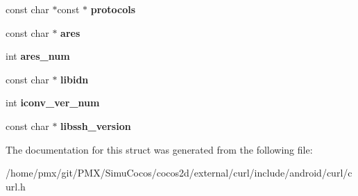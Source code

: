 \begin{DoxyCompactItemize}
\item 
\mbox{\label{structcurl__version__info__data_acf90bd53790e3b26dd1d03010a9a6516}} 
const char $\ast$const  $\ast$ {\bfseries protocols}
\item 
\mbox{\label{structcurl__version__info__data_a44cffda98cac6ecc48972b911553f78b}} 
const char $\ast$ {\bfseries ares}
\item 
\mbox{\label{structcurl__version__info__data_a6634337e6a73a5619aea6ad0d5d9837e}} 
int {\bfseries ares\+\_\+num}
\item 
\mbox{\label{structcurl__version__info__data_a217638accc13c01b2069a9b50e7d871f}} 
const char $\ast$ {\bfseries libidn}
\item 
\mbox{\label{structcurl__version__info__data_a17a8113033d8700eff033566f410065e}} 
int {\bfseries iconv\+\_\+ver\+\_\+num}
\item 
\mbox{\label{structcurl__version__info__data_a7280f2c8ca220a60b553fb97e7073eeb}} 
const char $\ast$ {\bfseries libssh\+\_\+version}
\end{DoxyCompactItemize}


The documentation for this struct was generated from the following file\+:\begin{DoxyCompactItemize}
\item 
/home/pmx/git/\+P\+M\+X/\+Simu\+Cocos/cocos2d/external/curl/include/android/curl/curl.\+h\end{DoxyCompactItemize}
